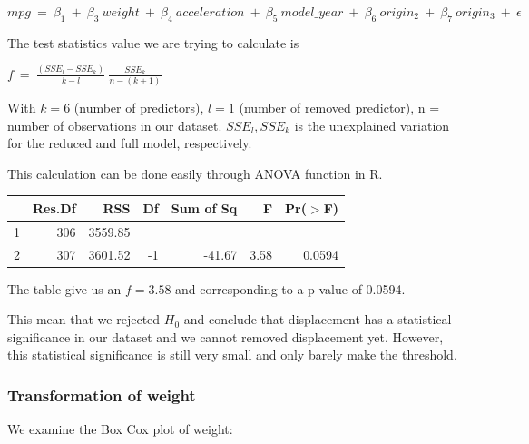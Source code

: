 \begin{center}
$
mpg \ = \ \beta_1 \ + \ \beta_3 \ weight \ + \ \beta_4 \ acceleration \ + \ \beta_5 \ model\_year \ + \ \beta_6 \ origin_2 \ + \ \beta_7 \ origin_3 \ + \ \epsilon
$
\end{center}

The test statistics value we are trying to calculate is 

\begin{center}
    $f \ = \ \frac{(SSE_l-SSE_k)}{k-l} \ \frac{SSE_k}{n-(k+1)}$
\end{center}

With $k = 6$ (number of predictors), $l = 1$ (number of removed predictor), n = number of observations in our dataset. $SSE_l,SSE_k$ is the unexplained variation for the reduced and full model, respectively.

This calculation can be done easily through ANOVA function in R.

\begin{table}[ht]
\centering
{}
\begin{tabular}{lrrrrrr}
  \hline
 & Res.Df & RSS & Df & Sum of Sq & F & Pr($>$F) \\ 
  \hline
1 & 306 & 3559.85 &  &  &  &  \\ 
  2 & 307 & 3601.52 & -1 & -41.67 & 3.58 & 0.0594 \\ 
   \hline
\end{tabular}
\end{table}

The table give us an $f = 3.58$ and corresponding to a p-value of 0.0594.

This mean that we rejected $H_0$ and conclude that displacement has a statistical significance in our dataset and we cannot removed displacement yet. However, this statistical significance is still very small and only barely make the threshold.

\subsubsection{Transformation of weight}

We examine the Box Cox plot of weight:

